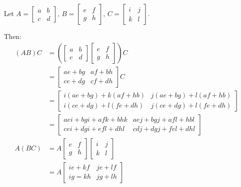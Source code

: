 \documentclass{article}
\begin{document}
\begin{enumerate}
\begin{enumerate}[label= (\alph*)]
\begin{enumerate}[label=(\roman*)]
                        Let $A=\begin{bmatrix} a&b\\c&d \end{bmatrix} ,\,
                        B=\begin{bmatrix} e&f\\g&h \end{bmatrix},\,
                        C=\begin{bmatrix} i&j\\k&l \end{bmatrix} $.

                        Then:
                        \begin{align*}
                            (AB)C&= \left(\begin{bmatrix} a&b\\c&d \end{bmatrix}\begin{bmatrix} e&f\\g&h \end{bmatrix} \right) C\\
                                 &= \begin{bmatrix} ae+bg&af+bh\\ce+dg&cf+dh\end{bmatrix} C\\
                                 &= \begin{bmatrix} i(ae+bg)+k(af+hb)&j(ae+bg)+l(af+hb)\\
                                 i(ce+dg)+l(fe+dh)&j(ce+dg)+l(fe+dh)\end{bmatrix}\\
                                 &= \begin{bmatrix} aei+bgi+afk+bhk&aej+bgj+afl+hbl\\cei+dgi+efl+dhl&cdj+dgj+fel+dhl\end{bmatrix}  \\
                            A(BC)&=A\begin{bmatrix} e&f\\g&h \end{bmatrix}\begin{bmatrix} i&j\\k&l \end{bmatrix} \\
                                &=A\begin{bmatrix}ie+kf&je+lf\\ig=kh&jg+lh\end{bmatrix}\\

\end{align*}
\end{enumerate}
\end{enumerate}
\end{enumerate}
\end{document}
